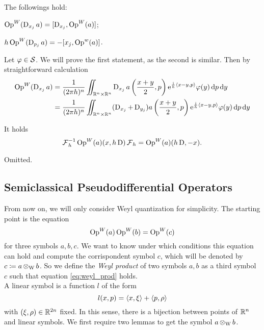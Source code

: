 \begin{nprop}
\label{prop:quant_commut}
The followings hold:
\begin{compactitem}
\item $\operatorname{Op}^{W}(\operatorname{D}_{x_{j}}a)=[\operatorname{D}_{x_{j}},\operatorname{Op}^{W}(a)]$;
\item $h\operatorname{Op}^{W}(\operatorname{D}_{p_{j}}a)=-[x_{j},\operatorname{Op}^{w}(a)]$.
\end{compactitem}
\end{nprop}
\begin{prf}
Let $\varphi\in\mathcal{S}$. We will prove the first statement, as the second is similar. Then by straightforward calculation
\begin{align*}
\operatorname{Op}^{W}(\operatorname{D}_{x_{j}}a)&=\frac{1}{(2\pi h)^{n}}\iint_{\mathbb{R}^{n}\times\mathbb{R}^{n}}\operatorname{D}_{x_{j}}a\left(\frac{x+y}{2},p\right)\mathrm{e}^{\frac{\mathrm{i}}{h}\left< x-y,p\right>}\varphi(y)\mathop{}\!\mathrm{d} p\mathop{}\!\mathrm{d} y\\
&=\frac{1}{(2\pi h)^{n}}\iint_{\mathbb{R}^{n}\times\mathbb{R}^{n}}(\operatorname{D}_{x_{j}}+\operatorname{D}_{y_{j}})a\left(\frac{x+y}{2},p\right)\mathrm{e}^{\frac{\mathrm{i}}{h}\left< x-y,p\right>}\varphi(y)\mathop{}\!\mathrm{d} p\mathop{}\!\mathrm{d} y
\end{align*}
\end{prf}

\begin{nprop}[conjugation]
\label{prop:semic_fourier_conj}
It holds
\[
\operatorname{\mathcal{F}}_{h}^{-1}\operatorname{Op}^{W}(a)(x,h\operatorname{D})\operatorname{\mathcal{F}}_{h}=\operatorname{Op}^{W}(a)(h\operatorname{D},-x).
\]
\end{nprop}
\begin{prf}
Omitted.
\end{prf}



\subsection{Semiclassical Pseudodifferential Operators}

From now on, we will only consider Weyl quantization for simplicity. The starting point is the equation
\begin{equation}
\label{eq:weyl_prod}
\operatorname{Op}^{W}(a)\operatorname{Op}^{W}(b)=\operatorname{Op}^{W}(c)
\end{equation}
for three symbols $a,b,c$. We want to know under which conditions this equation can hold and compute the corrispondent symbol $c$, which will be denoted by $c\coloneqq a\operatorname{\otimes_{W}} b$. So we define the \emph{Weyl product} of two symbols $a,b$ as a third symbol $c$ such that equation \eqref{eq:weyl_prod} holds.\\
A linear symbol is a function $l$ of the form 
\[
l(x,p)=\left< x,\xi\right>+\left< p,\rho\right>
\]
with $(\xi,\rho)\in\mathbb{R}^{2n}$ fixed. In this sense, there is a bijection between points of $\mathbb{R}^{n}$ and linear symbols. We first require two lemmas to get the symbol $a\operatorname{\otimes_{W}} b$.

